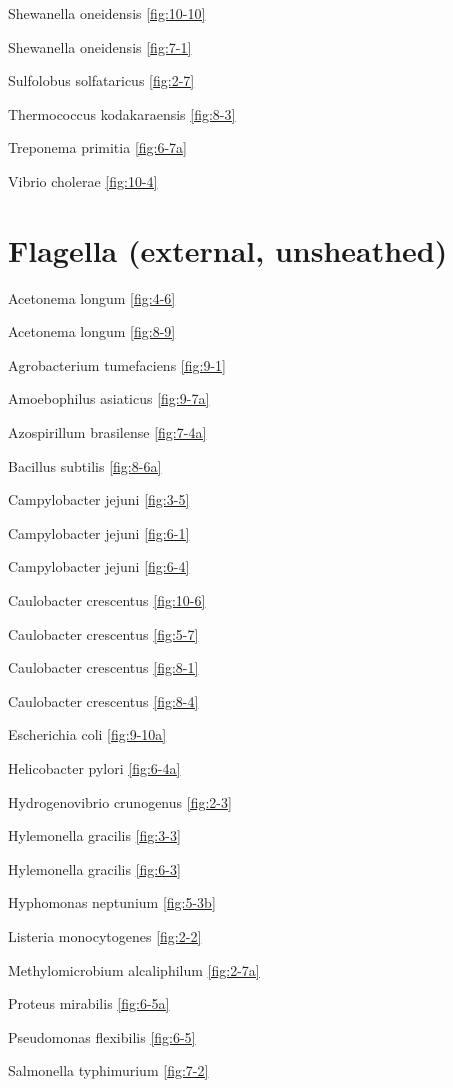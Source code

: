 \documentclass[]{tufte-book}
\begin{document}
Shewanella oneidensis \ref{fig:10-10}

Shewanella oneidensis \ref{fig:7-1}

Sulfolobus solfataricus \ref{fig:2-7}

Thermococcus kodakaraensis \ref{fig:8-3}

Treponema primitia \ref{fig:6-7a}

Vibrio cholerae \ref{fig:10-4}

\section*{Flagella (external,
unsheathed)}\label{flagella-external-unsheathed}

Acetonema longum \ref{fig:4-6}

Acetonema longum \ref{fig:8-9}

Agrobacterium tumefaciens \ref{fig:9-1}

Amoebophilus asiaticus \ref{fig:9-7a}

Azospirillum brasilense \ref{fig:7-4a}

Bacillus subtilis \ref{fig:8-6a}

Campylobacter jejuni \ref{fig:3-5}

Campylobacter jejuni \ref{fig:6-1}

Campylobacter jejuni \ref{fig:6-4}

Caulobacter crescentus \ref{fig:10-6}

Caulobacter crescentus \ref{fig:5-7}

Caulobacter crescentus \ref{fig:8-1}

Caulobacter crescentus \ref{fig:8-4}

Escherichia coli \ref{fig:9-10a}

Helicobacter pylori \ref{fig:6-4a}

Hydrogenovibrio crunogenus \ref{fig:2-3}

Hylemonella gracilis \ref{fig:3-3}

Hylemonella gracilis \ref{fig:6-3}

Hyphomonas neptunium \ref{fig:5-3b}

Listeria monocytogenes \ref{fig:2-2}

Methylomicrobium alcaliphilum \ref{fig:2-7a}

Proteus mirabilis \ref{fig:6-5a}

Pseudomonas flexibilis \ref{fig:6-5}

Salmonella typhimurium \ref{fig:7-2}
\end{document}
